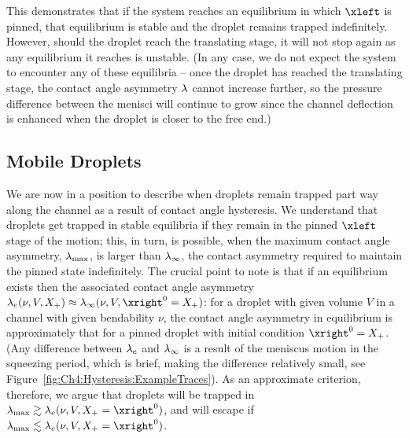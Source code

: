This demonstrates that if the system reaches an equilibrium in which $\xleft$ is pinned, that equilibrium is stable and the droplet remains trapped indefinitely. However, should the droplet reach the translating stage, it will not stop again as any equilibrium it reaches is unstable. (In any case, we do not expect the system to encounter any of these equilibria -- once the droplet has reached the translating stage, the contact angle asymmetry $\lambda$ cannot increase further, so the pressure difference between the menisci will continue to grow since the channel deflection is enhanced when the droplet is closer to the free end.)



\subsection{Mobile Droplets}
We are now in a position to describe when droplets remain trapped part way along the channel as a result of contact angle hysteresis. We understand that droplets get trapped in stable equilibria  if they remain in the pinned $\xleft$ stage of the motion; this, in turn, is possible, when the maximum contact angle asymmetry, $\lambda_{\text{max}}$, is larger than $\lambda_{\infty}$, the contact asymmetry required to maintain the pinned state indefinitely.  The crucial point to note is that if an equilibrium exists then the associated contact angle asymmetry $\hyspare(\nu, V, \xrighteq) \approx \hyspari(\nu, V, \xright^0 =\xrighteq)$: for a droplet with given volume $V$ in a channel with given bendability $\nu$, the contact angle asymmetry in equilibrium is approximately that for a pinned droplet with initial condition $\xright^0 = \xrighteq$. (Any difference between $\lambda_e$ and $\lambda_{\infty}$ is a result of the  meniscus motion in the squeezing period, which is brief, making the difference relatively small, see Figure~\ref{fig:Ch4:Hysteresis:ExampleTraces}). As an approximate criterion, therefore, we argue that droplets will be trapped in $\hysparmax \gtrsim \hyspare(\nu, V, \xrighteq = \xright^0)$, and will escape if $\hysparmax \lesssim\hyspare(\nu, V, \xrighteq = \xright^0)$.

